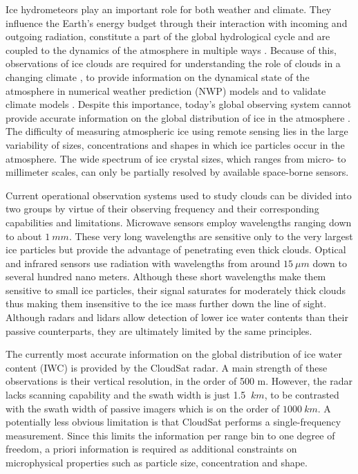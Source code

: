 \documentclass[journal abbreviation, manuscript]{copernicus}
\begin{document}
\introduction  %


Ice hydrometeors play an important role for both weather and climate. They
influence the Earth's energy budget through their interaction with incoming and
outgoing radiation, constitute a part of the global hydrological cycle and are
coupled to the dynamics of the atmosphere in multiple ways \citep{bony15}.
Because of this, observations of ice clouds are required for understanding the
role of clouds in a changing climate \citep{boucher13}, to provide information
on the dynamical state of the atmosphere in numerical weather prediction (NWP)
models \citep{geer} and to validate climate models \citep{waliser09}. Despite
this importance, today's global observing system cannot provide accurate
information on the global distribution of ice in the atmosphere
\citep{eliasson11,duncan18a}. The difficulty of measuring atmospheric ice using
remote sensing lies in the large variability of sizes, concentrations and shapes
in which ice particles occur in the atmosphere. The wide spectrum of ice crystal
sizes, which ranges from micro- to millimeter scales, can only be partially
resolved by available space-borne sensors.

Current operational observation systems used to study clouds can be divided into
two groups by virtue of their observing frequency and their corresponding
capabilities and limitations. Microwave sensors employ wavelengths ranging down
to about $1\ \unit{mm}$. These very long wavelengths are sensitive only to the
very largest ice particles but provide the advantage of penetrating even thick
clouds. Optical and infrared sensors use radiation with wavelengths from around
$15\ \unit{\mu m}$ down to several hundred nano meters. Although these short
wavelengths make them sensitive to small ice particles, their signal saturates
for moderately thick clouds thus making them insensitive to the ice mass further
down the line of sight. Although radars and lidars allow detection of lower ice
water contents than their passive counterparts, they are ultimately limited by
the same principles.

The currently most accurate information on the global distribution of ice water
content (IWC) is provided by the CloudSat radar. A main strength of these
observations is their vertical resolution, in the order of 500 m. However, the
radar lacks scanning capability and the swath width is just 1.5 $\ \unit{km}$,
to be contrasted with the swath width of passive imagers which is on the order
of $1000\ \unit{km}$. A potentially less obvious limitation is that CloudSat
performs a single-frequency measurement. Since this limits the information per
range bin to one degree of freedom, a priori information is required as
additional constraints on microphysical properties such as particle size,
concentration and shape.
\end{document}
